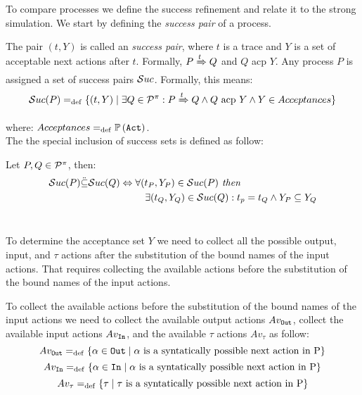To compare \picalc{} processes we define the success refinement and relate it to the strong simulation. We start by defining the \textit{success pair} of a process.

The pair $(t, Y)$ is called an \textit{success pair}, where $t$ is a trace and $Y$ is a set of acceptable next actions after $t$. Formally, $P \xRightarrow{t} Q$ and $Q$ acp $Y$. Any process
$P$ is assigned a set of success pairs $\Successes[]$. Formally, this means:
\begin{align}
    \Successes[P] \define \{(t,Y) \mid \exists Q\in\procs: P \bigstep{t} Q \wedge Q \text{ acp } Y \wedge Y\in Acceptances\}
\end{align}

where: $Acceptances =_{\mathrm{def}} \mathbb P\left(\mathtt{Act}\right)$.
\\The the special inclusion of success sets is defined as follow:
\begin{definition}
\label{def_success_inclutuion_ref}
Let $P,Q\in\mathcal P^{\pi}$, then:
\begin{equation*}
\begin{aligned}
\Successes[P] \ddot{\subseteq} \Successes[Q] \Leftrightarrow {} & \forall (t_P, Y_P) \in \Successes[P] \textit{ then }\\
      & \ \ \ \exists (t_Q, Y_Q) \in \Successes[Q]: t_p = t_Q \wedge Y_P \subseteq Y_Q
\end{aligned}
\end{equation*}
\ 
\end{definition}
To determine the acceptance set $Y$ we need to collect all the possible output, input, and $\tau$ actions after the substitution of the bound names of the input actions. That requires collecting the available actions before the substitution of the bound names of the input actions.

To collect the available actions before the substitution of the bound names of the input actions we need to collect the available output actions $Av_{\mathtt{Out}}$, collect the available input actions $Av_{\mathtt{In}}$, and the available $\tau$ actions $Av_\tau$ as follow:
\[Av_{\mathtt{Out}}=_{\mathrm{def}}\{ \alpha \in \mathtt{Out} \mid \alpha\text{ is a syntatically possible next action in P}\}\]
\[Av_{\mathtt{In}}=_{\mathrm{def}}\{ \alpha \in \mathtt{In} \mid \alpha\text{ is a syntatically possible next action in P}\}\]
\[Av_\tau=_{\mathrm{def}}\{ \tau \mid \tau\text{ is a syntatically possible next action in P}\}\]

